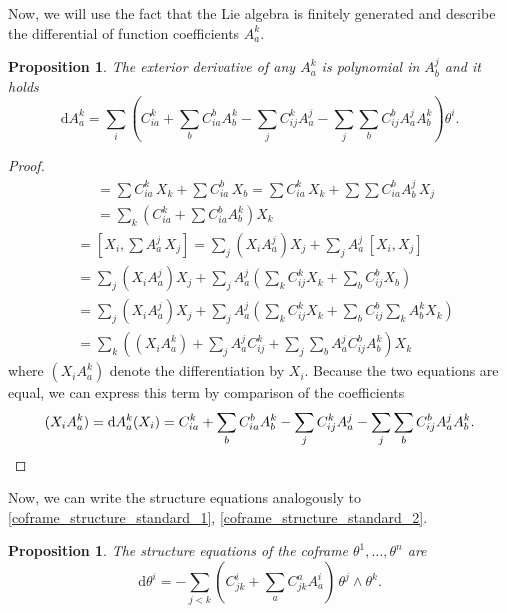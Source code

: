 \documentclass{amsart}
\theoremstyle{plain}
\newtheorem{proposition}[theorem]{Proposition}
\theoremstyle{definition}
\theoremstyle{remark}
\newcommand{\di}{\mathrm{d}}
\begin{document}
Now, we will use the fact that the Lie algebra is finitely generated and describe the differential of function coefficients $A_a^k$.
%
\begin{proposition}
    The exterior derivative of any $A_a^k$ is polynomial in $A_b^j$ and it holds
    \begin{equation}\label{coefficient_function_differential}
        \di A_a^k = \sum_i \left(
        C_{ia}^k + \sum_b C_{ia}^b A_b^k - \sum_j C_{ij}^k A_a^j - \sum_j \sum_b C_{ij}^b A_a^j A_b^k
        \right) \theta^i.
    \end{equation} 
\end{proposition}
\begin{proof}
    \begin{align*}
        [X_i,X_a] &= \sum C_{ia}^k \,X_k + \sum C_{ia}^b \,X_b = \sum C_{ia}^k \,X_k + \sum \sum C_{ia}^b A_b^j \,X_j\\
        &= \sum_k \left( C_{ia}^k + \sum C_{ia}^b A_b^k \right) X_k
    \end{align*}
    \begin{align*}
        [X_i, X_a] &= [X_i, \sum A_a^j \,X_j] = \sum_j \left( X_i A_a^j \right) X_j + \sum_j A_a^j \,[X_i,X_j]\\
        &= \sum_j \left( X_i A_a^j \right) X_j + \sum_j A_a^j \left( \sum_k C_{ij}^k X_k + \sum_b C_{ij}^b X_b \right)\\
        &= \sum_j \left( X_i A_a^j \right) X_j + \sum_j A_a^j \left( \sum_k C_{ij}^k X_k + \sum_b C_{ij}^b \sum_k A_b^k X_k \right)\\
        &= \sum_k \left( (X_i A_a^k) + \sum_j A_a^j C_{ij}^k + \sum_j \sum_b A_a^j C_{ij}^b A_b^k \right) X_k
    \end{align*}
    where $(X_i A_a^k)$ denote the differentiation by $X_i$. Because the two equations are equal, we can express this term by comparison of the coefficients
    \begin{equation} \label{XiAak}
        (X_i A_a^k) = \di A_a^k (X_i) = C_{ia}^k + \sum_b C_{ia}^b A_b^k - \sum_j C_{ij}^k A_a^j - \sum_j \sum_b C_{ij}^b A_a^j A_b^k. \qedhere
    \end{equation}
\end{proof}
%
Now, we can write the structure equations analogously to \eqref{coframe_structure_standard_1}, \eqref{coframe_structure_standard_2}.
%
\begin{proposition}
    The structure equations of the coframe $\theta^1, \dots, \theta^n$ are
    \begin{equation}\label{structure_equation}
        \di \theta^i = -\sum_{j<k} \left( C_{jk}^i + \sum_a C_{jk}^a A_a^i \right)\, \theta^j \wedge \theta^k.
    \end{equation}
\end{proposition}
\end{document}
